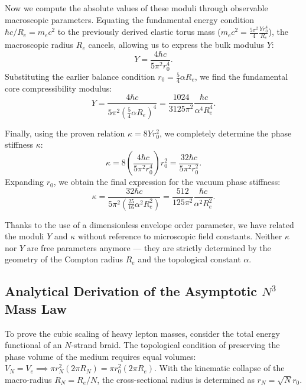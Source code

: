 \documentclass[11pt,a4paper]{article}
\begin{document}
Now we compute the absolute values of these moduli through observable macroscopic parameters.
Equating the fundamental energy condition $\hbar c / R_e = m_e c^2$ to the previously derived elastic torus mass ($m_e c^2 = \frac{5\pi^2}{4} \frac{Y r_0^4}{R_e}$), the macroscopic radius $R_e$ cancels, allowing us to express the bulk modulus $Y$:
\begin{equation}
Y = \frac{4 \hbar c}{5\pi^2 r_0^4}.
\end{equation}
Substituting the earlier balance condition $r_0 = \frac{5}{4}\alpha R_e$, we find the fundamental core compressibility modulus:
\begin{equation}
Y = \frac{4 \hbar c}{5\pi^2 \left( \frac{5}{4}\alpha R_e \right)^4} = \frac{1024}{3125 \pi^2} \frac{\hbar c}{\alpha^4 R_e^4}.
\end{equation}

Finally, using the proven relation $\kappa = 8 Y r_0^2$, we completely determine the phase stiffness $\kappa$:
\begin{equation}
\kappa = 8 \left( \frac{4 \hbar c}{5\pi^2 r_0^4} \right) r_0^2 = \frac{32 \hbar c}{5\pi^2 r_0^2}.
\end{equation}
Expanding $r_0$, we obtain the final expression for the vacuum phase stiffness:
\begin{equation}
\kappa = \frac{32 \hbar c}{5\pi^2 \left(\frac{25}{16} \alpha^2 R_e^2\right)} = \frac{512}{125 \pi^2} \frac{\hbar c}{\alpha^2 R_e^2}.
\end{equation}

Thanks to the use of a dimensionless envelope order parameter, we have related the moduli $Y$ and $\kappa$ without reference to microscopic field constants. Neither $\kappa$ nor $Y$ are free parameters anymore — they are strictly determined by the geometry of the Compton radius $R_e$ and the topological constant $\alpha$.

\subsection{Analytical Derivation of the Asymptotic $N^3$ Mass Law}
To prove the cubic scaling of heavy lepton masses, consider the total energy functional of an $N$-strand braid. The topological condition of preserving the phase volume of the medium requires equal volumes: $V_N = V_e \implies \pi r_N^2 (2\pi R_N) = \pi r_0^2 (2\pi R_e)$. With the kinematic collapse of the macro-radius $R_N = R_e / N$, the cross-sectional radius is determined as $r_N = \sqrt{N} r_0$.
\end{document}
